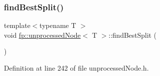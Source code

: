 \subsubsection{\texorpdfstring{find\+Best\+Split()}{findBestSplit()}\hspace{0.1cm}{\footnotesize\ttfamily [1/2]}}
{\footnotesize\ttfamily template$<$typename T $>$ \\
void \hyperlink{classfp_1_1unprocessedNode}{fp\+::unprocessed\+Node}$<$ T $>$\+::find\+Best\+Split (\begin{DoxyParamCaption}{ }\end{DoxyParamCaption})\hspace{0.3cm}{\ttfamily [inline]}}



Definition at line 242 of file unprocessed\+Node.\+h.


